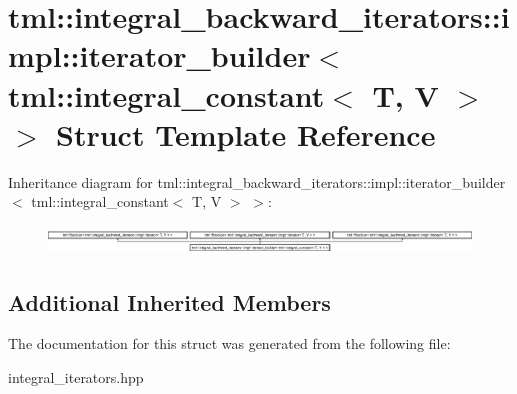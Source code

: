 \hypertarget{structtml_1_1integral__backward__iterators_1_1impl_1_1iterator__builder_3_01tml_1_1integral__constant_3_01T_00_01V_01_4_01_4}{\section{tml\+:\+:integral\+\_\+backward\+\_\+iterators\+:\+:impl\+:\+:iterator\+\_\+builder$<$ tml\+:\+:integral\+\_\+constant$<$ T, V $>$ $>$ Struct Template Reference}
\label{structtml_1_1integral__backward__iterators_1_1impl_1_1iterator__builder_3_01tml_1_1integral__constant_3_01T_00_01V_01_4_01_4}
}
Inheritance diagram for tml\+:\+:integral\+\_\+backward\+\_\+iterators\+:\+:impl\+:\+:iterator\+\_\+builder$<$ tml\+:\+:integral\+\_\+constant$<$ T, V $>$ $>$\+:\begin{figure}[H]
\begin{center}
\leavevmode
\includegraphics[height=0.734908cm]{structtml_1_1integral__backward__iterators_1_1impl_1_1iterator__builder_3_01tml_1_1integral__constant_3_01T_00_01V_01_4_01_4}
\end{center}
\end{figure}
\subsection*{Additional Inherited Members}


The documentation for this struct was generated from the following file\+:\begin{DoxyCompactItemize}
\item 
integral\+\_\+iterators.\+hpp\end{DoxyCompactItemize}
